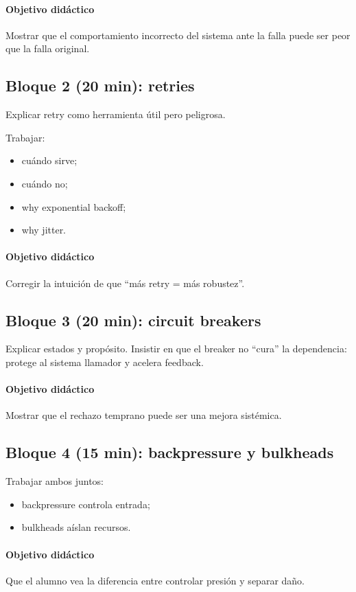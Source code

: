 \documentclass[variant=docente,cover=institutional,mode=screen]{ua-engineering-v6-article}
\begin{document}
\paragraph{Objetivo didáctico}
Mostrar que el comportamiento incorrecto del sistema ante la falla puede ser peor que la falla original.

\subsection*{Bloque 2 (20 min): retries}
Explicar retry como herramienta útil pero peligrosa.

Trabajar:
\begin{itemize}
\item cuándo sirve;
\item cuándo no;
\item why exponential backoff;
\item why jitter.
\end{itemize}

\paragraph{Objetivo didáctico}
Corregir la intuición de que “más retry = más robustez”.

\subsection*{Bloque 3 (20 min): circuit breakers}
Explicar estados y propósito. Insistir en que el breaker no “cura” la dependencia: protege al sistema llamador y acelera feedback.

\paragraph{Objetivo didáctico}
Mostrar que el rechazo temprano puede ser una mejora sistémica.

\subsection*{Bloque 4 (15 min): backpressure y bulkheads}
Trabajar ambos juntos:
\begin{itemize}
\item backpressure controla entrada;
\item bulkheads aíslan recursos.
\end{itemize}

\paragraph{Objetivo didáctico}
Que el alumno vea la diferencia entre controlar presión y separar daño.
\end{document}
